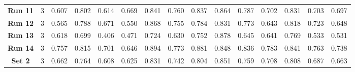 \begin{table*}[!ht]
{\begin{tabular}{|c|c|ccc|ccc|ccc|c|c|c|c|}
			\textbf{Run 11} & 3 & \multicolumn{1}{c|}{0.607} & \multicolumn{1}{c|}{0.802} & 0.614 & \multicolumn{1}{c|}{0.669} & \multicolumn{1}{c|}{0.841} & 0.760 & \multicolumn{1}{c|}{0.837} & \multicolumn{1}{c|}{0.864} & 0.787 & 0.702 & 0.831 & 0.703 & 0.697 \\
			
			\textbf{Run 12} & 3 & \multicolumn{1}{c|}{0.565} & \multicolumn{1}{c|}{0.788} & 0.671 & \multicolumn{1}{c|}{0.550} & \multicolumn{1}{c|}{0.868} & 0.755 & \multicolumn{1}{c|}{0.784} & \multicolumn{1}{c|}{0.831} & 0.773 & 0.643 & 0.818 & 0.723 & 0.648 \\
			
			\textbf{Run 13} & 3 & \multicolumn{1}{c|}{0.618} & \multicolumn{1}{c|}{0.699} & 0.406 & \multicolumn{1}{c|}{0.471} & \multicolumn{1}{c|}{0.724} & 0.630 & \multicolumn{1}{c|}{0.752} & \multicolumn{1}{c|}{0.878} & 0.645 & 0.641 & 0.769 & 0.533 & 0.531 \\
			
			\textbf{Run 14} & 3 & \multicolumn{1}{c|}{0.757} & \multicolumn{1}{c|}{0.815} & 0.701 & \multicolumn{1}{c|}{0.646} & \multicolumn{1}{c|}{0.894} & 0.773 & \multicolumn{1}{c|}{0.881} & \multicolumn{1}{c|}{0.848} & 0.836 & 0.783 & 0.841 & 0.763 & 0.738 \\
			
			\hline
			
			\textbf{Set 2} & 3 & \multicolumn{1}{c|}{0.662} & \multicolumn{1}{c|}{0.764} & 0.608 & \multicolumn{1}{c|}{0.625} & \multicolumn{1}{c|}{0.831} & 0.742 & \multicolumn{1}{c|}{0.804} & \multicolumn{1}{c|}{0.851} & 0.759 & 0.708 & 0.808 & 0.687 & 0.663 \\
			
			\hline
			
	\end{tabular}}
	\label{tab:SegmentationUNetVariability}
\end{table*}